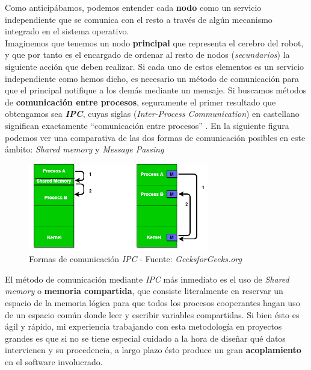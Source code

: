 Como anticipábamos, podemos entender cada \textbf{nodo} como un servicio independiente que se comunica con el resto a través de algún mecanismo integrado en el sistema operativo.\\

Imaginemos que tenemos un nodo \textbf{principal} que representa el cerebro del robot, y que por tanto es el encargado de ordenar al resto de nodos (\textit{secundarios}) la siguiente acción que deben realizar. Si cada uno de estos elementos es un servicio independiente como hemos dicho, es necesario un método de comunicación para que el principal notifique a los demás mediante un mensaje. Si buscamos métodos de \textbf{comunicación entre procesos}, seguramente el primer resultado que obtengamos sea \textbf{\textit{IPC}}, cuyas siglas (\textit{Inter-Process Communication}) en castellano significan exactamente ``comunicación entre procesos'' \cite{ipc}. En la siguiente figura podemos ver una comparativa de las dos formas de comunicación posibles en este ámbito: \textit{Shared memory} y \textit{Message Passing}\\

\begin{figure}[h]
	\centering
	\includegraphics[width=0.7\textwidth]{imagenes/ipc.png}
	\caption{Formas de comunicación \textit{IPC} - Fuente: \textit{GeeksforGeeks.org} \cite{ipc}}
\end{figure}

El método de comunicación mediante \textit{IPC} más inmediato es el uso de \textit{Shared memory} o \textbf{memoria compartida}, que consiste literalmente en reservar un espacio de la memoria lógica para que todos los procesos cooperantes hagan uso de un espacio común donde leer y escribir variables compartidas. Si bien ésto es ágil y rápido, mi experiencia trabajando con esta metodología en proyectos grandes es que si no se tiene especial cuidado a la hora de diseñar qué datos intervienen y su procedencia, a largo plazo ésto produce un gran \textbf{acoplamiento} en el software involucrado.\\

